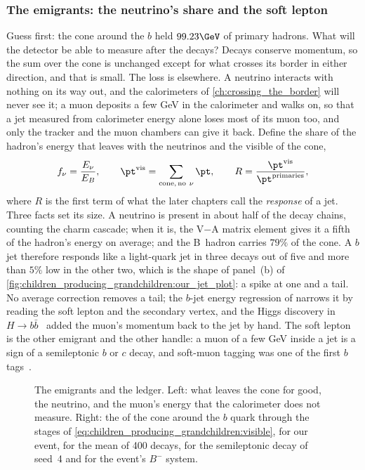 \subsubsection{The emigrants: the neutrino's share and the soft lepton}
\label{sec:children_producing_grandchildren:emigrant}

Guess first: the cone around the $b$ held $99.23\GeV$ of primary hadrons.
What will the detector be able to measure after the decays? Decays
conserve momentum, so the sum over the cone is unchanged except for what
crosses its border in either direction, and that is small. The loss is
elsewhere. A neutrino interacts with nothing on its way out, and the
calorimeters of \cref{ch:crossing_the_border} will never see it; a muon
deposits a few GeV in the calorimeter and walks on, so that a jet measured
from calorimeter energy alone loses most of its muon too, and only the
tracker and the muon chambers can give it back. Define the share of the
hadron's energy that leaves with the neutrinos and the visible \pt of the
cone,
\begin{equation}
  f_\nu=\frac{E_\nu}{E_B},\qquad
  \pt^{\mathrm{vis}}=\sum_{\mathrm{cone},\,\mathrm{no}\ \nu}\pt,\qquad
  R=\frac{\pt^{\mathrm{vis}}}{\pt^{\mathrm{primaries}}},
  \label{eq:children_producing_grandchildren:visible}
\end{equation}
where $R$ is the first term of what the later chapters call the
\emph{response} of a jet. Three facts set its size. A neutrino is present
in about half of the decay chains, counting the charm cascade; when it
is, the V$-$A matrix element gives it a fifth of the hadron's energy on
average; and the B~hadron carries $79\%$ of the cone. A $b$ jet therefore
responds like a light-quark jet in three decays out of five and more than
$5\%$ low in the other two, which is the shape of panel~(b) of
\cref{fig:children_producing_grandchildren:our_jet_plot}: a spike at one
and a tail. No average correction removes a tail; the $b$-jet energy
regression of \cite{CMS:2019uxx} narrows it by reading the soft lepton
and the secondary vertex, and the Higgs discovery in
$H\to b\bar b$~\cite{CMS:2018nsn} added the muon's momentum back to the
jet by hand. The soft lepton is the other emigrant and the other handle:
a muon of a few GeV inside a jet is a sign of a semileptonic $b$ or $c$
decay, and soft-muon tagging was one of the first $b$ tags~\cite{CMS:2012feb}.

\begin{figure}[htbp]\centering
\resizebox{\textwidth}{!}{}
\caption[What leaves the cone for good, and the cone through the stages]{The
emigrants and the ledger. Left: what leaves the cone for good, the
neutrino, and the muon's energy that the calorimeter does not measure.
Right: the \pt of the cone around the $b$ quark through the stages of
\cref{eq:children_producing_grandchildren:visible}, for our event, for the
mean of 400 decays, for the semileptonic decay of seed~4 and for the
\CMSSW event's $B^-$ system.}
\label{fig:children_producing_grandchildren:emigrant_sketch}
\end{figure}

